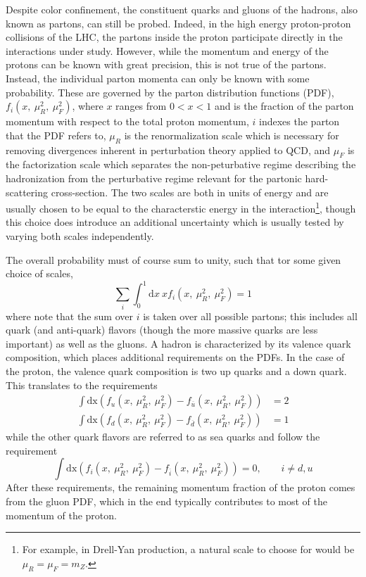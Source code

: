 Despite color confinement, 
the constituent quarks and gluons of the hadrons, also known as partons, can still 
be probed. Indeed, in the high energy proton-proton collisions of the LHC, 
the partons inside the proton participate
directly in the interactions under study.  However,
while the momentum and energy of the protons can be known with
great precision, 
this is not true of the partons. Instead, the individual
parton momenta can only be known with some probability.
These are governed by the parton distribution functions (PDF),
$f_i(x,~\mu_R^2,~\mu_F^2)$, where $x$ ranges from $0<x<1$ and is the fraction of 
the parton momentum 
with respect to the total proton momentum, $i$ indexes the parton
that the PDF refers to, 
$\mu_R$ is the renormalization scale which is necessary for
removing divergences inherent in perturbation theory applied to QCD, and 
$\mu_F$ is the factorization scale which separates the non-peturbative
regime describing the hadronization from the perturbative regime
relevant for the partonic hard-scattering cross-section.
The two scales are both in units of energy 
and are usually chosen to be equal to the characterstic
energy in the interaction\footnote{For example, in Drell-Yan production, 
a natural scale to choose for would be $\mu_R = \mu_F = m_Z$.},
though this choice does introduce an additional uncertainty which
is usually tested by varying both scales independently.

The overall probability must of course sum to unity, such that
tor some given choice of scales, 
\begin{equation}
\sum_i \int_0^1 \mathrm{d}x~x f_i(x,~\mu_R^2,~\mu_F^2) = 1
\end{equation}
where note that the sum over $i$ is taken over all possible partons;
this includes all quark (and anti-quark) flavors (though the more massive quarks 
are less important) as well as the gluons.
A hadron is characterized by its valence quark 
composition, which places additional requirements on the PDFs. 
In the case of the proton, the valence quark composition is 
two up quarks and a down quark.
This translates to the requirements 
\begin{align}
\int \mathrm{dx} (f_u(x,~\mu_R^2,~\mu_F^2) - f_{\overline{u}}(x,~\mu_R^2,~\mu_F^2) ) &= 2 \\
\int \mathrm{dx} (f_d(x,~\mu_R^2,~\mu_F^2) - f_{\overline{d}}(x,~\mu_R^2,~\mu_F^2) ) &= 1 
\end{align}
while the other quark flavors are referred to as sea quarks 
and follow the requirement
\begin{equation}
\int \mathrm{dx} (f_i(x,~\mu_R^2,~\mu_F^2) - f_{\overline{i}}(x,~\mu_R^2,~\mu_F^2) ) = 0, ~~~~~~~~~ i\neq d,u
\end{equation}
After these requirements, the remaining momentum fraction of the proton
comes from the gluon PDF, which in the end typically contributes to most
of the momentum of the proton.

